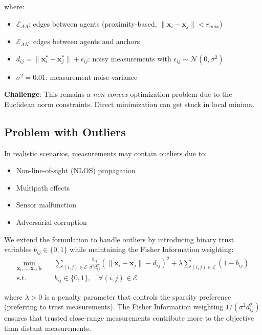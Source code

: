 \documentclass[11pt,a4paper]{article}
\begin{document}
where:
\begin{itemize}
    \item $\mathcal{E}_{AA}$: edges between agents (proximity-based, $\|\mathbf{x}_i - \mathbf{x}_j\| < r_{max}$)
    \item $\mathcal{E}_{AN}$: edges between agents and anchors
    \item $d_{ij} = \|\mathbf{x}_i^* - \mathbf{x}_j^*\| + \epsilon_{ij}$: noisy measurements with $\epsilon_{ij} \sim \mathcal{N}(0, \sigma^2)$
    \item $\sigma^2 = 0.01$: measurement noise variance
\end{itemize}

\textbf{Challenge}: This remains a \emph{non-convex} optimization problem due to the Euclidean norm constraints. Direct minimization can get stuck in local minima.

\subsection{Problem with Outliers}

In realistic scenarios, measurements may contain outliers due to:
\begin{itemize}
    \item Non-line-of-sight (NLOS) propagation
    \item Multipath effects
    \item Sensor malfunction
    \item Adversarial corruption
\end{itemize}

We extend the formulation to handle outliers by introducing binary trust variables $b_{ij} \in \{0, 1\}$ while maintaining the Fisher Information weighting:
\begin{equation}
\boxed{
\begin{aligned}
\min_{\mathbf{x}_1, \ldots, \mathbf{x}_n, \mathbf{b}} \quad & \sum_{(i,j) \in \mathcal{E}} \frac{b_{ij}}{\sigma^2 d_{ij}^2} \left(\|\mathbf{x}_i - \mathbf{x}_j\| - d_{ij}\right)^2 + \lambda \sum_{(i,j) \in \mathcal{E}} (1 - b_{ij}) \\
\text{s.t.} \quad & b_{ij} \in \{0, 1\}, \quad \forall (i,j) \in \mathcal{E}
\end{aligned}
}
\label{eq:outlier_problem}
\end{equation}

where $\lambda > 0$ is a penalty parameter that controls the sparsity preference (preferring to trust measurements). The Fisher Information weighting $1/(\sigma^2 d_{ij}^2)$ ensures that trusted close-range measurements contribute more to the objective than distant measurements.
\end{document}
